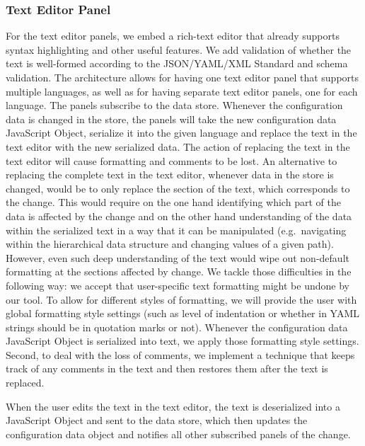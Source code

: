 
\subsubsection{Text Editor Panel} %
For the text editor panels, we embed a rich-text editor that already supports syntax highlighting and other useful features.
We add validation of whether the text is well-formed according to the JSON/YAML/XML Standard and schema validation. %
The architecture allows for having one text editor panel that supports multiple languages, as well as for having separate text editor panels, one for each language.
The panels subscribe to the data store.
Whenever the configuration data is changed in the store, the panels will take the new configuration data JavaScript Object, serialize it into the given language and replace the text in the text editor with the new serialized data.
The action of replacing the text in the text editor will cause formatting and comments to be lost.
An alternative to replacing the complete text in the text editor, whenever data in the store is changed, would be to only replace the section of the text, which corresponds to the change.
This would require on the one hand identifying which part of the data is affected by the change and on the other hand understanding of the data within the serialized text in a way that it can be manipulated (e.g.\ navigating within the hierarchical data structure and changing values of a given path). %
However, even such deep understanding of the text would wipe out non-default formatting at the sections affected by change.
We tackle those difficulties in the following way: we accept that user-specific text formatting might be undone by our tool.
To allow for different styles of formatting, we will provide the user with global formatting style settings (such as level of indentation or whether in YAML strings should be in quotation marks or not). %
Whenever the configuration data JavaScript Object is serialized into text, we apply those formatting style settings.
Second, to deal with the loss of comments, we implement a technique that keeps track of any comments in the text and then restores them after the text is replaced. %

When the user edits the text in the text editor, the text is deserialized into a JavaScript Object and sent to the data store, which then updates the configuration data object and notifies all other subscribed panels of the change.

